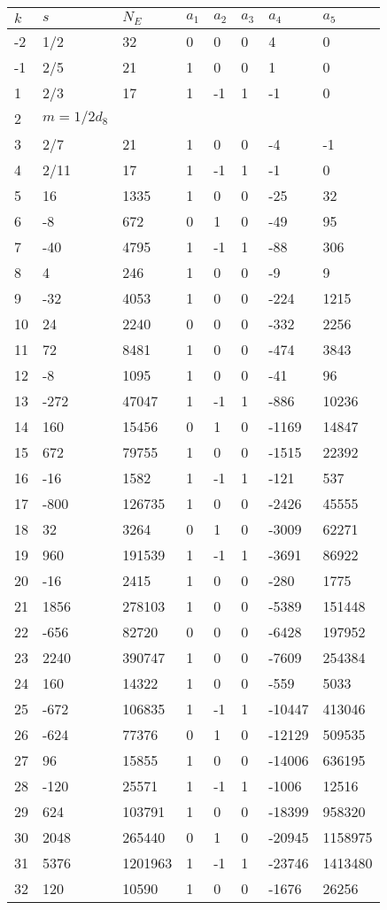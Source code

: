 \documentclass{amsart}
\begin{document}
\begin{longtable}{|l|l|l|lllll|}
\hline
$k$ & $s$ & $N_E$ & $a_1$ & $a_2$ & $a_3$ & $a_4$ & $a_5$\\
\hline
-2&1/2&32&0&0&0&4&0\\
-1&2/5&21&1&0&0&1&0\\
1&2/3&17&1&-1&1&-1&0\\
2&$m=1/2d_{8}$&&\multicolumn{5}{c|}{}\\
3&2/7&21&1&0&0&-4&-1\\
4&2/11&17&1&-1&1&-1&0\\
5&16&1335&1&0&0&-25&32\\
6&-8&672&0&1&0&-49&95\\
7&-40&4795&1&-1&1&-88&306\\
8&4&246&1&0&0&-9&9\\
9&-32&4053&1&0&0&-224&1215\\
10&24&2240&0&0&0&-332&2256\\
11&72&8481&1&0&0&-474&3843\\
12&-8&1095&1&0&0&-41&96\\
13&-272&47047&1&-1&1&-886&10236\\
14&160&15456&0&1&0&-1169&14847\\
15&672&79755&1&0&0&-1515&22392\\
16&-16&1582&1&-1&1&-121&537\\
17&-800&126735&1&0&0&-2426&45555\\
18&32&3264&0&1&0&-3009&62271\\
19&960&191539&1&-1&1&-3691&86922\\
20&-16&2415&1&0&0&-280&1775\\
21&1856&278103&1&0&0&-5389&151448\\
22&-656&82720&0&0&0&-6428&197952\\
23&2240&390747&1&0&0&-7609&254384\\
24&160&14322&1&0&0&-559&5033\\
25&-672&106835&1&-1&1&-10447&413046\\
26&-624&77376&0&1&0&-12129&509535\\
27&96&15855&1&0&0&-14006&636195\\
28&-120&25571&1&-1&1&-1006&12516\\
29&624&103791&1&0&0&-18399&958320\\
30&2048&265440&0&1&0&-20945&1158975\\
31&5376&1201963&1&-1&1&-23746&1413480\\
32&120&10590&1&0&0&-1676&26256\\

\end{longtable}
\end{document}
